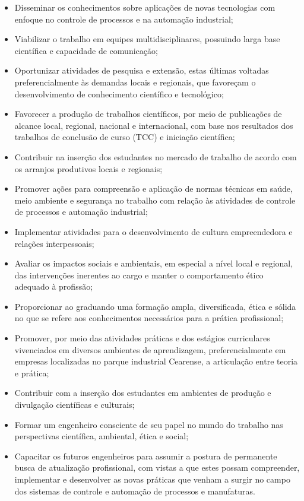 \begin{itemize}
	\item Disseminar os conhecimentos sobre aplicações de novas tecnologias com enfoque no controle de processos e na automação industrial;
	\item Viabilizar o trabalho em equipes multidisciplinares, possuindo larga base científica e capacidade de comunicação;
	\item Oportunizar atividades de pesquisa e extensão, estas últimas voltadas preferencialmente às demandas locais e regionais, que favoreçam o desenvolvimento de conhecimento científico e
	tecnológico;
	\item Favorecer a produção de trabalhos científicos, por meio de publicações de alcance local, regional, nacional e
	internacional, com base nos resultados dos trabalhos de conclusão de curso (TCC) e iniciação científica;
	\item Contribuir na inserção dos estudantes no mercado de trabalho de acordo com os arranjos produtivos locais e regionais;
	\item Promover ações para compreensão e aplicação de normas técnicas em saúde, meio ambiente e segurança no trabalho com
	relação às atividades de controle de processos e automação industrial;
	\item Implementar atividades para o desenvolvimento de cultura empreendedora e relações interpessoais;
	\item Avaliar os impactos sociais e ambientais, em especial a nível local e regional, das intervenções inerentes ao cargo e manter o comportamento ético adequado à profissão;
	\item Proporcionar ao graduando uma formação ampla, diversificada, ética e sólida no que se refere aos conhecimentos necessários para a prática profissional;
	\item Promover, por meio das atividades práticas e dos estágios curriculares vivenciados em diversos ambientes de aprendizagem, preferencialmente em empresas localizadas no parque industrial Cearense, a articulação entre teoria e prática;
	\item Contribuir com a inserção dos estudantes em ambientes de produção e divulgação científicas e culturais;
	\item Formar um engenheiro consciente de seu papel no mundo do trabalho nas perspectivas científica, ambiental, ética e social;
	\item Capacitar os futuros engenheiros para assumir a postura de permanente busca de atualização profissional, com vistas a que estes possam compreender, implementar e desenvolver as novas práticas que venham a surgir no campo dos sistemas de controle e automação de processos e manufaturas.
\end{itemize}